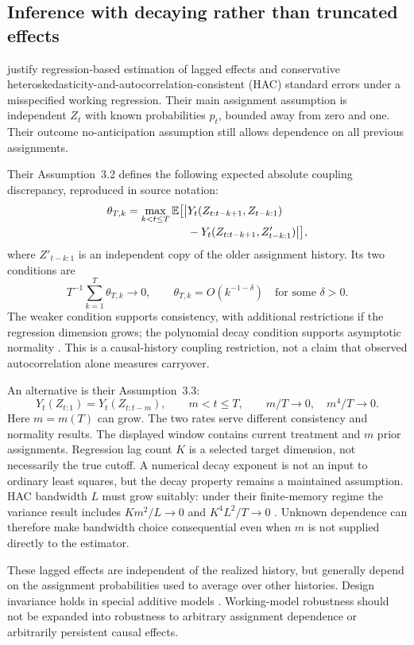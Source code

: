 \subsection{Inference with decaying rather than truncated effects}

\citet{linding2025} justify regression-based estimation of lagged effects and conservative heteroskedasticity-and-autocorrelation-consistent (HAC) standard errors under a misspecified working regression. Their main assignment assumption is independent $Z_t$ with known probabilities $p_t$, bounded away from zero and one. Their outcome no-anticipation assumption still allows dependence on all previous assignments.

Their Assumption~3.2 defines the following expected absolute coupling discrepancy, reproduced in source notation:
\begin{align}
 \theta_{T,k}=\max_{k<t\leq T}\mathbb{E}\big[\big|
 &Y_t(Z_{t:t-k+1},Z_{t-k:1})\notag\\[-2pt]
 &-Y_t(Z_{t:t-k+1},Z'_{t-k:1})\big|\big],
\end{align}
where $Z'_{t-k:1}$ is an independent copy of the older assignment history. Its two conditions are
\[
 T^{-1}\sum_{k=1}^T\theta_{T,k}\longrightarrow0,
 \qquad
 \theta_{T,k}=O(k^{-1-\delta})\quad\text{for some }\delta>0.
\]
The weaker condition supports consistency, with additional restrictions if the regression dimension grows; the polynomial decay condition supports asymptotic normality \citep[Assumption~3.2, pp.~8--9]{linding2025}. This is a causal-history coupling restriction, not a claim that observed autocorrelation alone measures carryover.

An alternative is their Assumption~3.3:
\[
 Y_t(Z_{t:1})=Y_t(Z_{t:t-m}),\qquad m<t\leq T,
 \qquad m/T\to0,\quad m^4/T\to0.
\]
Here $m=m(T)$ can grow. The two rates serve different consistency and normality results. The displayed window contains current treatment and $m$ prior assignments. Regression lag count $K$ is a selected target dimension, not necessarily the true cutoff. A numerical decay exponent is not an input to ordinary least squares, but the decay property remains a maintained assumption. HAC bandwidth $L$ must grow suitably: under their finite-memory regime the variance result includes $Km^2/L\to0$ and $K^4L^2/T\to0$ \citep[Theorem~3.3, p.~13]{linding2025}. Unknown dependence can therefore make bandwidth choice consequential even when $m$ is not supplied directly to the estimator.

These lagged effects are independent of the realized history, but generally depend on the assignment probabilities used to average over other histories. Design invariance holds in special additive models \citep[Remark~2.1, p.~8]{linding2025}. Working-model robustness should not be expanded into robustness to arbitrary assignment dependence or arbitrarily persistent causal effects.

